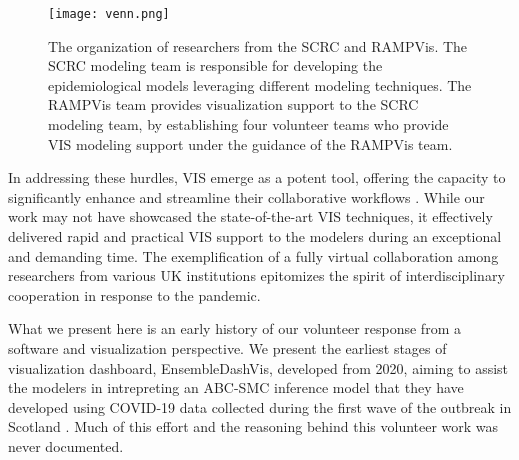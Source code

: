 \begin{figure}[tb!]
    \centering
    \texttt{[image: venn.png]}
    \caption{The organization of researchers from the SCRC and RAMPVis. The SCRC modeling team is responsible for developing the epidemiological models leveraging different modeling techniques. The RAMPVis team provides visualization support to the SCRC modeling team, by establishing four volunteer teams who provide VIS modeling support under the guidance of the RAMPVis team.
    }
    \label{fig:venn}

\end{figure}

In addressing these hurdles, \ac{VIS} emerge as a potent tool, offering the capacity to significantly enhance and streamline their collaborative workflows \cite{swallow2022Challenges}.
While our work may not have showcased the state-of-the-art VIS techniques, it effectively delivered rapid and practical VIS support to the modelers during an exceptional and demanding time.
The exemplification of a fully virtual collaboration among researchers from various UK institutions epitomizes the spirit of interdisciplinary cooperation in response to the pandemic.

What we present here is an early history of our volunteer response from a software and visualization perspective. We present the earliest stages of visualization dashboard, EnsembleDashVis, developed from 2020, aiming to assist the modelers in intrepreting an \ac{ABC-SMC} inference model that they have developed using COVID-19 data collected during the first wave of the outbreak in Scotland \cite{scrc2020Covid19}. Much of this effort and the reasoning behind this volunteer work was never documented.
